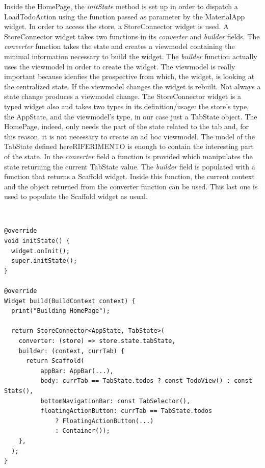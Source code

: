 Inside the HomePage, the \textit{initState} method is set up in order to dispatch a LoadTodoAction using the function passed as parameter by the MaterialApp widget. In order to access the store, a StoreConnector widget is used. A StoreConnector widget takes two functions in its \textit{converter }and \textit{builder }fields. The \textit{converter} function takes the state and creates a viewmodel containing the minimal information necessary to build the widget. The \textit{builder} function actually uses the viewmodel in order to create the widget. The viewmodel is really important because idenfies the prospective from which, the widget, is looking at the centralized state. If the viewmodel changes the widget is rebuilt. Not always a state change produces a viewmodel change. The StoreConnector widget is a typed widget also and takes two types in its definition/usage: the store's type, the AppState, and the viewmodel's type, in our case just a TabState object. The HomePage, indeed, only needs the part of the state related to the tab and, for this reason, it is not necessary to create an ad hoc viewmodel. The model of the TabState defined hereRIFERIMENTO is enough to contain the interesting part of the state. In the \textit{converter }field a function is provided which manipulates the state returning the current TabState value. The \textit{builder} field is populated with a function that returns a Scaffold widget. Inside this function, the current context and the object returned from the converter function can be used. This last one is used to populate the Scaffold widget as usual.
\begin{code}
\mbox{}\\
 \mbox{}
		\label{code:2.14}
\begin{verbatim}
@override
void initState() {
  widget.onInit();
  super.initState();
}

@override
Widget build(BuildContext context) {
  print("Building HomePage");

  return StoreConnector<AppState, TabState>(
    converter: (store) => store.state.tabState,
    builder: (context, currTab) {
      return Scaffold(
          appBar: AppBar(...),
          body: currTab == TabState.todos ? const TodoView() : const Stats(),
          bottomNavigationBar: const TabSelector(),
          floatingActionButton: currTab == TabState.todos
              ? FloatingActionButton(...)
              : Container());
    },
  );
}
\end{verbatim}
\mbox{}
\end{code}

